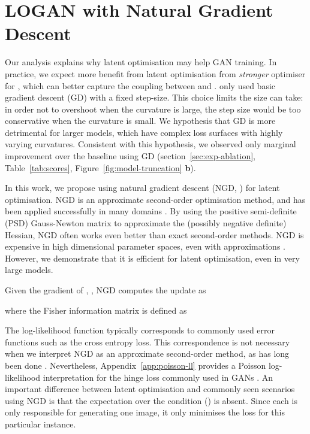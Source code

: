 \documentclass{article} \usepackage{iclr2020_conference,times}
\begin{document}
\section{LOGAN with Natural Gradient Descent}
\label{sec:logan-ngd}

Our analysis explains why latent optimisation may help GAN training. In practice, we expect more benefit from latent optimisation from \emph{stronger} optimiser for , which can better capture the coupling between  and .
\cite{wu2019deep} only used basic gradient descent (GD) with a fixed step-size. This choice limits the size  can take: in order not to overshoot when the curvature is large, the step size would be too conservative when the curvature is small. We hypothesis that GD is more detrimental for larger models, which have complex loss surfaces with highly varying curvatures. Consistent with this hypothesis, we observed only marginal improvement over the baseline using GD (section~\ref{sec:exp-ablation}, Table~\ref{tab:scores}, Figure~\ref{fig:model-truncation} \textbf{b}).

In this work, we propose using natural gradient descent (NGD, \citealt{amari1998natural}) for latent optimisation. NGD is an approximate second-order optimisation method, and has been applied successfully in many domains \citep{pascanu2013revisiting,martens2014new}. By using the positive semi-definite (PSD) Gauss-Newton matrix to approximate the (possibly negative definite) Hessian, NGD often works even better than exact second-order methods. NGD is expensive in high dimensional parameter spaces, even with approximations \citep{martens2014new}. However, we demonstrate that it is efficient for latent optimisation, even in very large models.


Given the gradient of , , NGD computes the update as

where the Fisher information matrix  is defined as

The log-likelihood function  typically corresponds to commonly used error functions such as the cross entropy loss. This correspondence is not necessary when we interpret NGD as an approximate second-order method, as has long been done \citep{martens2014new}. Nevertheless, Appendix~\ref{app:poisson-ll} provides a Poisson log-likelihood interpretation for the hinge loss commonly used in GANs \citep{lim2017geometric,tran2017hierarchical}.
An important difference between latent optimisation and commonly seen scenarios using NGD is that the expectation over the condition () is absent. Since each  is only responsible for generating one image, it only minimises the loss  for this particular instance.
\end{document}
